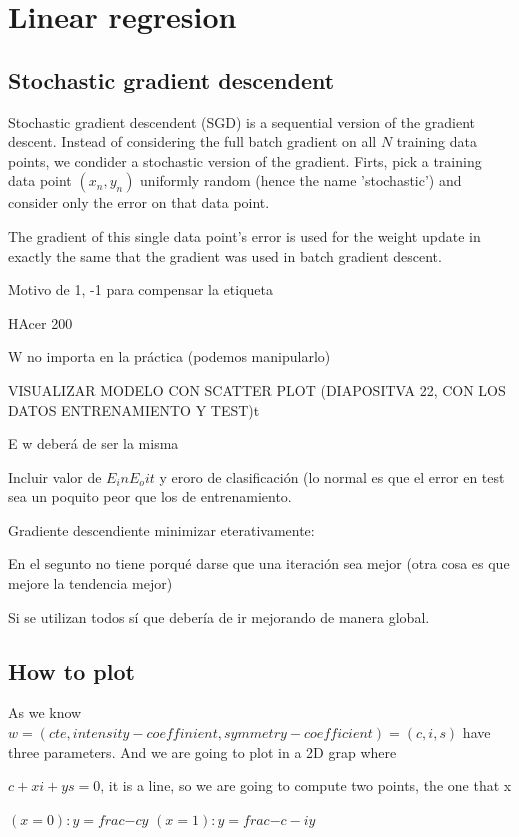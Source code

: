 
\section{ Linear regresion }
\subsection{Stochastic gradient descendent}


Stochastic gradient descendent (SGD) is a sequential version of the gradient descent. Instead of considering the full batch gradient on all $N$
training data points, we condider a stochastic version of the gradient. Firts, pick a training data point $(x_n, y_n)$ uniformly random
(hence the name 'stochastic') and consider only the error on that data point.

The gradient of this single data point's error is used for the weight update in exactly the same that the gradient was used in batch gradient descent.


Motivo de 1, -1 para compensar la etiqueta

HAcer 200

W no importa en la práctica (podemos manipularlo)

VISUALIZAR MODELO CON SCATTER PLOT (DIAPOSITVA 22, CON LOS DATOS ENTRENAMIENTO Y TEST)t

E w deberá de ser la misma

Incluir valor de $E_in E_oit$ y eroro de clasificación (lo normal es que el error en test sea un poquito peor que los de entrenamiento.

Gradiente descendiente minimizar eterativamente:

En el segunto no tiene porqué darse que una iteración sea mejor (otra cosa es que mejore la tendencia mejor)

Si se utilizan todos sí que debería de ir mejorando de manera global.


\subsection{ How to plot }

As we know $w = ( cte, intensity-coeffinient, symmetry-coefficient) = (c,i,s)$ have three parameters. And we are going to plot in a 2D grap where

$c + x i + y s = 0$, it is a line, so we are going to compute two points, the one that x 

$(x = 0): y = frac{-c}{y}$
$(x=1): y = frac{-c - i}{y}$



